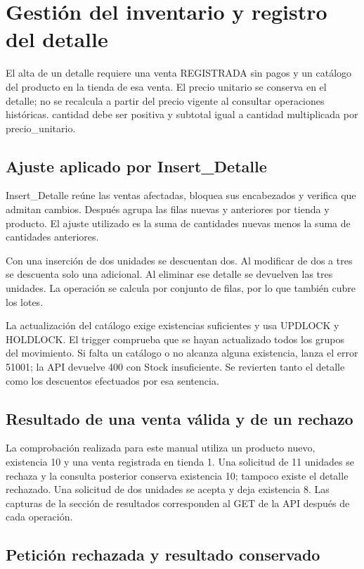 \documentclass[10pt,letterpaper]{article}
\begin{document}
\section{Gestión del inventario y registro del detalle}
El alta de un detalle requiere una venta REGISTRADA sin pagos y un catálogo del producto en la tienda de esa venta. El precio unitario se conserva en el detalle; no se recalcula a partir del precio vigente al consultar operaciones históricas. cantidad debe ser positiva y subtotal igual a cantidad multiplicada por precio\_unitario.

\subsection{Ajuste aplicado por Insert\_Detalle}
Insert\_Detalle reúne las ventas afectadas, bloquea sus encabezados y verifica que admitan cambios. Después agrupa las filas nuevas y anteriores por tienda y producto. El ajuste utilizado es la suma de cantidades nuevas menos la suma de cantidades anteriores.

Con una inserción de dos unidades se descuentan dos. Al modificar de dos a tres se descuenta solo una adicional. Al eliminar ese detalle se devuelven las tres unidades. La operación se calcula por conjunto de filas, por lo que también cubre los lotes.

La actualización del catálogo exige existencias suficientes y usa UPDLOCK y HOLDLOCK. El trigger comprueba que se hayan actualizado todos los grupos del movimiento. Si falta un catálogo o no alcanza alguna existencia, lanza el error 51001; la API devuelve 400 con Stock insuficiente. Se revierten tanto el detalle como los descuentos efectuados por esa sentencia.

\subsection{Resultado de una venta válida y de un rechazo}
La comprobación realizada para este manual utiliza un producto nuevo, existencia 10 y una venta registrada en tienda 1. Una solicitud de 11 unidades se rechaza y la consulta posterior conserva existencia 10; tampoco existe el detalle rechazado. Una solicitud de dos unidades se acepta y deja existencia 8. Las capturas de la sección de resultados corresponden al GET de la API después de cada operación.



\subsection{Petición rechazada y resultado conservado}
\end{document}
